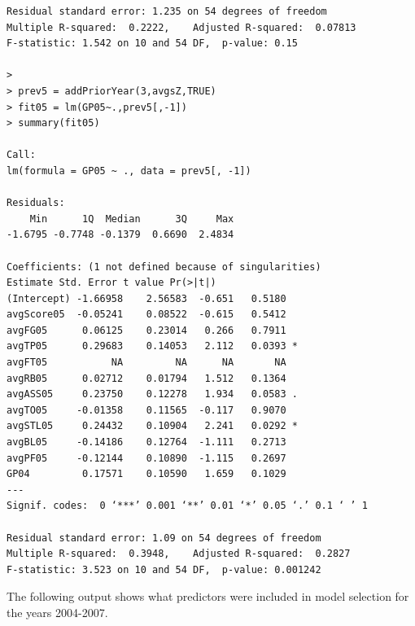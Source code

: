 \documentclass[]{scrartcl}
\begin{document}
\begin{verbatim}
Residual standard error: 1.235 on 54 degrees of freedom
Multiple R-squared:  0.2222,	Adjusted R-squared:  0.07813 
F-statistic: 1.542 on 10 and 54 DF,  p-value: 0.15

> 
> prev5 = addPriorYear(3,avgsZ,TRUE)
> fit05 = lm(GP05~.,prev5[,-1])
> summary(fit05)

Call:
lm(formula = GP05 ~ ., data = prev5[, -1])

Residuals:
    Min      1Q  Median      3Q     Max 
-1.6795 -0.7748 -0.1379  0.6690  2.4834 

Coefficients: (1 not defined because of singularities)
Estimate Std. Error t value Pr(>|t|)  
(Intercept) -1.66958    2.56583  -0.651   0.5180  
avgScore05  -0.05241    0.08522  -0.615   0.5412  
avgFG05      0.06125    0.23014   0.266   0.7911  
avgTP05      0.29683    0.14053   2.112   0.0393 *
avgFT05           NA         NA      NA       NA  
avgRB05      0.02712    0.01794   1.512   0.1364  
avgASS05     0.23750    0.12278   1.934   0.0583 .
avgTO05     -0.01358    0.11565  -0.117   0.9070  
avgSTL05     0.24432    0.10904   2.241   0.0292 *
avgBL05     -0.14186    0.12764  -1.111   0.2713  
avgPF05     -0.12144    0.10890  -1.115   0.2697  
GP04         0.17571    0.10590   1.659   0.1029  
---
Signif. codes:  0 ‘***’ 0.001 ‘**’ 0.01 ‘*’ 0.05 ‘.’ 0.1 ‘ ’ 1

Residual standard error: 1.09 on 54 degrees of freedom
Multiple R-squared:  0.3948,	Adjusted R-squared:  0.2827 
F-statistic: 3.523 on 10 and 54 DF,  p-value: 0.001242
\end{verbatim}
The following output shows what predictors were included in model selection for the years 2004-2007.
\end{document}
